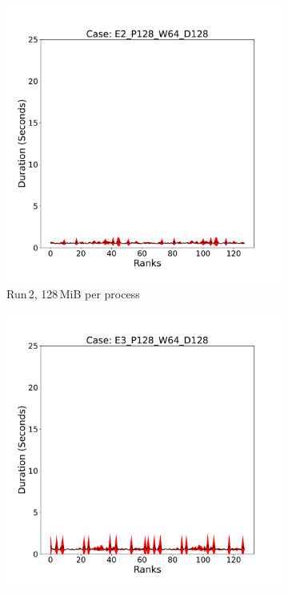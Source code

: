 \begin{figure}[h!]
\begin{subfigure}[b]{0.3\textwidth}
         \includegraphics[width=\textwidth, height=\textwidth]{figures/deisa1__E2_P128_W64_D128.pdf}
         \caption{Run\,2, 128\,MiB per process}
         \label{fig:E2_128_d11}
     \end{subfigure}
      \hfill
     \begin{subfigure}[b]{0.3\textwidth}
         \centering
         \includegraphics[width=\textwidth, height=\textwidth]{figures/deisa1__E3_P128_W64_D128.pdf}

\end{subfigure}
\end{figure}
